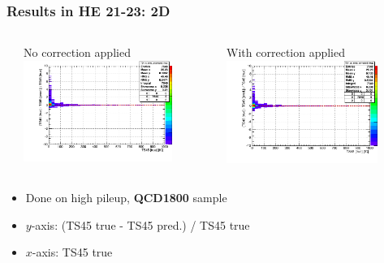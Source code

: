 \documentclass[bigger]{beamer}
\providecommand{\alert}[1]{\textbf{#1}}
\begin{document}
\begin{frame}
\frametitle{Results in HE 21-23: 2D}
\label{sec-3-3-10}
\begin{columns} %
\label{sec-3-3-10-1}
\begin{column}{0.55\textwidth}
\label{sec-3-3-10-1-1}

\centering
No correction applied
\includegraphics[width=0.8\textwidth]{fig/delta_uncorrected_QCD1800_ring_2.png}
\end{column}
\begin{column}{0.55\textwidth}
\label{sec-3-3-10-1-2}

\centering
With correction applied
\includegraphics[width=0.8\textwidth]{fig/delta_corrected_QCD1800_ring_2.png}
\end{column}
\end{columns}
\label{sec-3-3-10-2}
\begin{itemize}

\item Done on high pileup, \alert{QCD1800} sample
\label{sec-3-3-10-2-1}%

\item $y$-axis: (TS45 true - TS45 pred.) / TS45 true
\label{sec-3-3-10-2-2}%

\item $x$-axis: TS45 true
\label{sec-3-3-10-2-3}%

\end{itemize} %
\end{frame}
\end{document}
